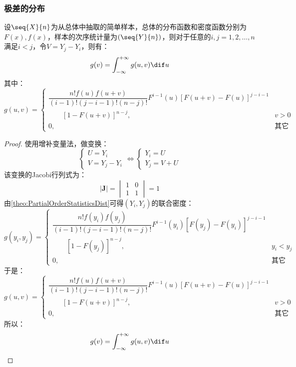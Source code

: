 \subsubsection{极差的分布}
\begin{theorem}
	设$\seq{X}{n}$为从总体中抽取的简单样本，总体的分布函数和密度函数分别为$F(x),f(x)$，样本的次序统计量为$(\seq{Y}{n})$，则对于任意的$i,j=1,2,\dots,n$满足$i<j$，令$V=Y_j-Y_i$，则有：
	\begin{equation*}
		g(v)=\int_{-\infty}^{+\infty}g(u,v)\dif u
	\end{equation*}
	其中：
	\begin{equation*}
		g(u,v)=
		\begin{cases}
			\dfrac{n!f(u)f(u+v)}{(i-1)!(j-i-1)!(n-j)!}F^{i-1}(u)[F(u+v)-F(u)]^{j-i-1} \\
			\quad\quad[1-F(u+v)]^{n-j},&v>0 \\
			0,&\text{其它}
		\end{cases}
	\end{equation*}
\end{theorem}
\begin{proof}
	使用增补变量法，做变换：
	\begin{equation*}
		\begin{cases}
			U=Y_i \\
			V=Y_j-Y_i
		\end{cases}
		\Leftrightarrow
		\begin{cases}
			Y_i=U \\
			Y_j=V+U
		\end{cases}
	\end{equation*}
	该变换的Jacobi行列式为：
	\begin{equation*}
		|\mathbf{J}|=
		\begin{vmatrix}
			1 & 0 \\
			1 & 1
		\end{vmatrix}
		=1
	\end{equation*}
	由\cref{theo:PartialOrderStatisticsDist}可得$(Y_i,Y_j)$的联合密度：
	\begin{equation*}
		g(y_i,y_j)=
		\begin{cases}
			\dfrac{n!f(y_i)f(y_j)}{(i-1)!(j-i-1)!(n-j)!}F^{i-1}(y_i)[F(y_j)-F(y_i)]^{j-i-1} \\
			\quad\quad[1-F(y_j)]^{n-j},&y_i<y_j \\
			0,&\text{其它}
		\end{cases}
	\end{equation*}
	于是：
	\begin{equation*}
		g(u,v)=
		\begin{cases}
			\dfrac{n!f(u)f(u+v)}{(i-1)!(j-i-1)!(n-j)!}F^{i-1}(u)[F(u+v)-F(u)]^{j-i-1} \\
			\quad\quad[1-F(u+v)]^{n-j},&v>0 \\
			0,&\text{其它}
		\end{cases}
	\end{equation*}
	所以：
	\begin{equation*}
		g(v)=\int_{-\infty}^{+\infty}g(u,v)\dif u\qedhere
	\end{equation*}
\end{proof}

